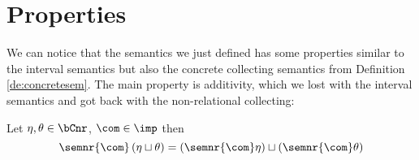 \section{Properties}
\label{sec:NRPorperties}

We can notice that the semantics we just defined has some properties
similar to the interval semantics but also the concrete collecting
semantics from Definition \ref{de:concretesem}. The main property is
additivity, which we lost with the interval semantics and got back
with the non-relational collecting:

\begin{lemma}[Additivity]
  Let \(\eta, \theta \in \bCnr\), \(\com\in\imp\) then
  \begin{equation*}
    \semnr{\com}\left(\eta \sqcup \theta\right) = \left(\semnr{\com}\eta\right) \sqcup \left(\semnr{\com}\theta\right)
  \end{equation*}
\end{lemma}


